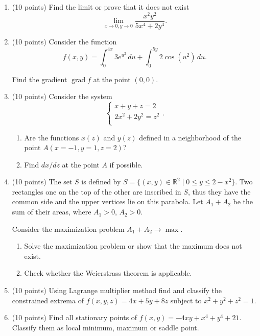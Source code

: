 \documentclass[12pt]{article} %
\theoremstyle{definition} %
\DeclareMathOperator{\grad}{grad}
\begin{document}
\begin{enumerate}

\item (10 points) Find the limit or prove that it does not exist
  \[
  \lim_{x \to 0, y \to 0} \frac{x^2 y^2}{5x^4 + 2y^4}.
  \]
  

\item (10 points) Consider the function 
\[
f(x, y) = \int_0^{4x} 3e^{u^2} \, du  + \int_0^{5y} 2\cos(u^2) \, du.   
\]

Find the gradient $\grad f$ at the point $(0, 0)$.

\item (10 points) Consider the system 
  \[
  \begin{cases}
    x + y + z = 2 \\
    2x^2 + 2y^2 = z^2 \\
  \end{cases}.  
  \]
  \begin{enumerate}
    \item Are the functions $x(z)$ and $y(z)$ defined in a neighborhood of the point $A(x=-1, y=1, z=2)$?
    \item Find $dx/dz$ at the point $A$ if possible. 
  \end{enumerate}

\item (10 points)  
The set $S$ is defined by $S = \{(x, y) \in \mathbb{R}^2 \mid 0 \leq y \leq 2- x^2\}$. 
Two rectangles one on the top of the other are inscribed in $S$, 
thus they have the common side and the upper vertices lie on this parabola.
Let $A_1 + A_2$ be the sum of their areas, where $A_1 >0$, $A_2 >0$. 

Consider the maximization problem $A_1 + A_2 \to \max$.
\begin{enumerate}
  \item Solve the maximization problem or show that the maximum does not exist.
  \item Check whether the Weierstrass theorem is applicable.
\end{enumerate}

\item (10 points)  Using Lagrange multiplier method find and classify 
the constrained extrema of $f(x, y, z) =  4x +5y + 8z$ subject to $x^2 + y^2 + z^2 = 1$.

\item (10 points)  Find all stationary points of $f(x,y) = -4xy + x^4 + y^4 + 21$. 
Classify them as local minimum, maximum or saddle point.





\end{enumerate}
\end{document}
